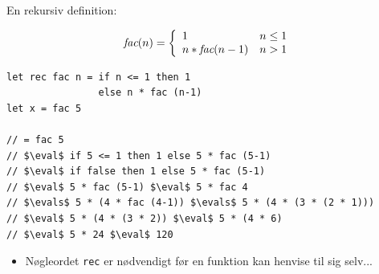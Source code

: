 \documentclass[rgb]{beamer}
\begin{document}
\begin{frame}[fragile]
\begin{footnotesize}


  En rekursiv definition:
  \vspace{-4mm}

  $$ \mbox{\it{fac}}(n) = \left \{ \begin{array}{lr} 1 & n \leq 1 \\ n*\mbox{\it{fac}}(n-1) & n > 1\end{array} \right . $$


\begin{lstlisting}[numbers=none,frame=none,mathescape]
let rec fac n = if n <= 1 then 1
                else n * fac (n-1)
let x = fac 5

// = fac 5
// $\eval$ if 5 <= 1 then 1 else 5 * fac (5-1)
// $\eval$ if false then 1 else 5 * fac (5-1)
// $\eval$ 5 * fac (5-1) $\eval$ 5 * fac 4
// $\evals$ 5 * (4 * fac (4-1)) $\evals$ 5 * (4 * (3 * (2 * 1)))
// $\eval$ 5 * (4 * (3 * 2)) $\eval$ 5 * (4 * 6)
// $\eval$ 5 * 24 $\eval$ 120
\end{lstlisting}

\begin{itemize}
\item Nøgleordet \lstinline{rec} er nødvendigt før en funktion kan henvise til sig selv...
\end{itemize}
\end{footnotesize}
\end{frame}

\newcommand{\addrRed}{{\tiny\id{\color{red}{0x23AF0$\bullet$}}}}
\newcommand{\addrTeal}{{\tiny\id{\color{teal}{0x9ABD0$\bullet$}}}}
\end{document}
